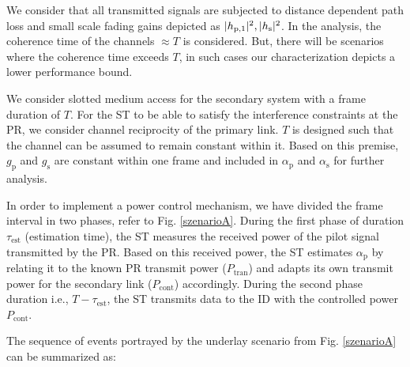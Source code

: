 We consider that all transmitted signals are subjected to distance dependent path loss and small scale fading gains depicted as $|h_{\text{p,1}}|^2, |h_{\text{s}}|^2$. In the analysis, the coherence time of the channels $\approx T$ is considered. But, there will be scenarios where the coherence time exceeds $T$, in such cases our characterization depicts a lower performance bound.



We consider slotted medium access for the secondary system with a frame duration of $T$. For the ST to be able to satisfy the interference constraints at the PR, we consider channel reciprocity of the primary link. $T$ is designed such that the channel can be assumed to remain constant within it. Based on this premise, $g_\textrm{p}$ and $g_\textrm{s}$ are constant within one frame and included in $\alpha_\textrm{p}$ and $\alpha_\textrm{s}$ for further analysis.

In order to implement a power control mechanism, we have divided the frame interval in two phases, refer to Fig. \ref{szenarioA}. During the first phase of duration $\tau_\textrm{est}$ (estimation time), the ST measures the received power of the pilot signal transmitted by the PR. Based on this received power, the ST estimates $\alpha_\textrm{p}$ by relating it to the known PR transmit power ($P_\textrm{tran}$) and adapts its own transmit power for the secondary link ($P_\textrm{cont}$) accordingly. During the second phase duration i.e., $T-\tau_\textrm{est}$, the ST transmits data to the ID with the controlled power $P_\textrm{cont}$.

The sequence of events portrayed by the underlay scenario from Fig. \ref{szenarioA} can be summarized as:

